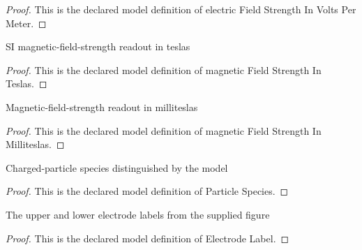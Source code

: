 \begin{proof}
  This is the declared model definition of electric Field Strength In Volts Per Meter.
\end{proof}
\begin{definition}
  \label{def:physics:phyx-mini-0640:phyxminiproblems-problemphyxmini0640-magneticfieldstrengthinteslas}
  SI magnetic-field-strength readout in teslas
\end{definition}
\begin{proof}
  This is the declared model definition of magnetic Field Strength In Teslas.
\end{proof}
\begin{definition}
  \label{def:physics:phyx-mini-0640:phyxminiproblems-problemphyxmini0640-magneticfieldstrengthinmilliteslas}
  Magnetic-field-strength readout in milliteslas
\end{definition}
\begin{proof}
  This is the declared model definition of magnetic Field Strength In Milliteslas.
\end{proof}
\begin{definition}
  \label{def:physics:phyx-mini-0640:phyxminiproblems-problemphyxmini0640-particlespecies}
  Charged-particle species distinguished by the model
\end{definition}
\begin{proof}
  This is the declared model definition of Particle Species.
\end{proof}
\begin{definition}
  \label{def:physics:phyx-mini-0640:phyxminiproblems-problemphyxmini0640-electrodelabel}
  The upper and lower electrode labels from the supplied figure
\end{definition}
\begin{proof}
  This is the declared model definition of Electrode Label.
\end{proof}
